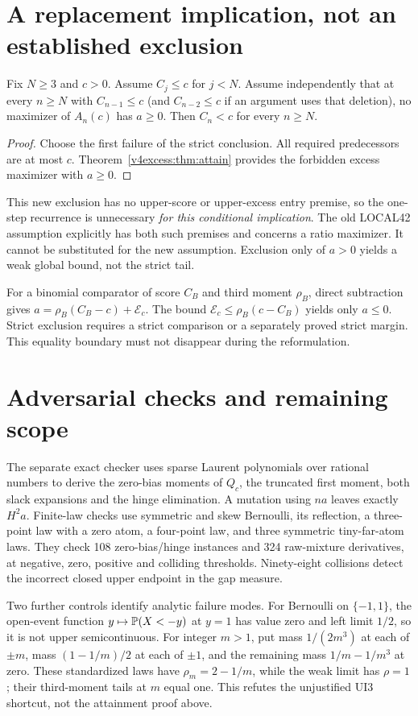 \section{A replacement implication, not an established exclusion}
\begin{corollary}\label{v4excess:cor:global}
Fix $N\ge3$ and $c>0$. Assume $C_j\le c$ for $j<N$. Assume independently
that at every $n\ge N$ with $C_{n-1}\le c$ (and $C_{n-2}\le c$ if an
argument uses that deletion), no maximizer of $A_n(c)$ has $a\ge0$.
Then $C_n<c$ for every $n\ge N$.
\end{corollary}
\begin{proof}
Choose the first failure of the strict conclusion. All required
predecessors are at most $c$. Theorem~\ref{v4excess:thm:attain} provides the
forbidden excess maximizer with $a\ge0$.
\end{proof}
This new exclusion has no upper-score or upper-excess entry premise, so
the one-step recurrence is unnecessary \emph{for this conditional
implication}. The old LOCAL42 assumption explicitly has both such
premises and concerns a ratio maximizer. It cannot be substituted for
the new assumption. Exclusion only of $a>0$ yields a weak global bound,
not the strict tail.

For a binomial comparator of score $C_B$ and third moment $\rho_B$,
direct subtraction gives
$a=\rho_B(C_B-c)+\mathcal E_c$. The bound
$\mathcal E_c\le\rho_B(c-C_B)$ yields only $a\le0$.
Strict exclusion requires a strict comparison or a separately proved
strict margin. This equality boundary must not disappear during the
reformulation.

\section{Adversarial checks and remaining scope}
The separate exact checker uses sparse Laurent polynomials over rational
numbers to derive the zero-bias moments of $Q_c$, the truncated first
moment, both slack expansions and the hinge elimination. A mutation
using $na$ leaves exactly $H^2a$. Finite-law checks use symmetric and
skew Bernoulli, its reflection, a three-point law with a zero atom, a
four-point law, and three symmetric tiny-far-atom laws. They check 108
zero-bias/hinge instances and 324 raw-mixture derivatives, at negative,
zero, positive and colliding thresholds. Ninety-eight collisions detect
the incorrect closed upper endpoint in the gap measure.

Two further controls identify analytic failure modes. For Bernoulli on
$\{-1,1\}$, the open-event function
$y\mapsto\mathbb P(X<-y)$ at $y=1$ has value zero and left limit $1/2$, so it
is not upper semicontinuous. For integer $m>1$, put mass $1/(2m^3)$ at
each of $\pm m$, mass $(1-1/m)/2$ at each of $\pm1$, and the remaining
mass $1/m-1/m^3$ at zero. These standardized laws have
$\rho_m=2-1/m$, while the weak limit has $\rho=1$; their third-moment
tails at $m$ equal one. This refutes the unjustified UI3 shortcut, not
the attainment proof above.

